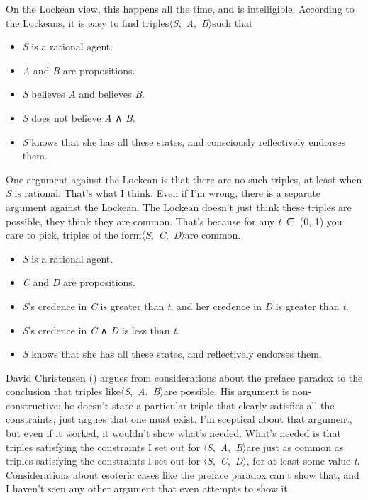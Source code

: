 \documentclass[
  10pt,
  letterpaper,
  twoside]{scrbook}
\providecommand{\tightlist}{%
  \setlength{\itemsep}{0pt}\setlength{\parskip}{0pt}}\usepackage{longtable,booktabs,array}
\begin{document}
On the Lockean view, this happens all the time, and is intelligible.
According to the Lockeans, it is easy to find
triples〈\emph{S},~\emph{A},~\emph{B}〉such that

\begin{itemize}
\tightlist
\item
  \emph{S} is a rational agent.
\item
  \emph{A} and \emph{B} are propositions.
\item
  \emph{S} believes \emph{A} and believes \emph{B}.
\item
  \emph{S} does not believe \emph{A} ∧ \emph{B}.
\item
  \emph{S} knows that she has all these states, and consciously
  reflectively endorses them.
\end{itemize}

One argument against the Lockean is that there are no such triples, at
least when \emph{S} is rational. That's what I think. Even if I'm wrong,
there is a separate argument against the Lockean. The Lockean doesn't
just think these triples are possible, they think they are common.
That's because for any \emph{t}~∈~(0, 1) you care to pick, triples of
the form〈\emph{S},~\emph{C},~\emph{D}〉are common.

\begin{itemize}
\tightlist
\item
  \emph{S} is a rational agent.
\item
  \emph{C} and \emph{D} are propositions.
\item
  \emph{S}'s credence in \emph{C} is greater than \emph{t}, and her
  credence in \emph{D} is greater than \emph{t}.
\item
  \emph{S}'s credence in \emph{C} ∧ \emph{D} is less than \emph{t}.
\item
  \emph{S} knows that she has all these states, and reflectively
  endorses them.
\end{itemize}

David Christensen () argues from
considerations about the preface paradox to the conclusion that triples
like〈\emph{S},~\emph{A},~\emph{B}〉are possible. His argument is
non-constructive; he doesn't state a particular triple that clearly
satisfies all the constraints, just argues that one must exist. I'm
sceptical about that argument, but even if it worked, it wouldn't show
what's needed. What's needed is that triples satisfying the constraints
I set out for 〈\emph{S},~\emph{A},~\emph{B}〉are just as common as
triples satisfying the constraints I set out for
〈\emph{S},~\emph{C},~\emph{D}〉, for at least some value \emph{t}.
Considerations about esoteric cases like the preface paradox can't show
that, and I haven't seen any other argument that even attempts to show
it.
\end{document}
